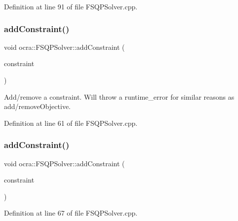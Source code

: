 Definition at line 91 of file F\+S\+Q\+P\+Solver.\+cpp.

\hypertarget{classocra_1_1FSQPSolver_a086d7ebf9d84c60347303237e3896266}{}\label{classocra_1_1FSQPSolver_a086d7ebf9d84c60347303237e3896266} 
\subsubsection{\texorpdfstring{add\+Constraint()}{addConstraint()}\hspace{0.1cm}{\footnotesize\ttfamily [1/2]}}
{\footnotesize\ttfamily void ocra\+::\+F\+S\+Q\+P\+Solver\+::add\+Constraint (\begin{DoxyParamCaption}\item[{\hyperlink{namespaceocra_ae8b87cf4099be3efc3b410019ad2046e}{Linear\+Constraint} \&}]{constraint }\end{DoxyParamCaption})}

Add/remove a constraint. Will throw a runtime\+\_\+error for similar reasons as add/remove\+Objective. 

Definition at line 61 of file F\+S\+Q\+P\+Solver.\+cpp.

\hypertarget{classocra_1_1FSQPSolver_afefe2d2f4e3cbc39c22971adfe475c75}{}\label{classocra_1_1FSQPSolver_afefe2d2f4e3cbc39c22971adfe475c75} 
\subsubsection{\texorpdfstring{add\+Constraint()}{addConstraint()}\hspace{0.1cm}{\footnotesize\ttfamily [2/2]}}
{\footnotesize\ttfamily void ocra\+::\+F\+S\+Q\+P\+Solver\+::add\+Constraint (\begin{DoxyParamCaption}\item[{\hyperlink{namespaceocra_af10341108ce661566aad00908668e2b1}{Generic\+Constraint} \&}]{constraint }\end{DoxyParamCaption})}



Definition at line 67 of file F\+S\+Q\+P\+Solver.\+cpp.

\hypertarget{classocra_1_1FSQPSolver_a22838ed156e3b4742e2a72ff128b8a4b}{}\label{classocra_1_1FSQPSolver_a22838ed156e3b4742e2a72ff128b8a4b} 
